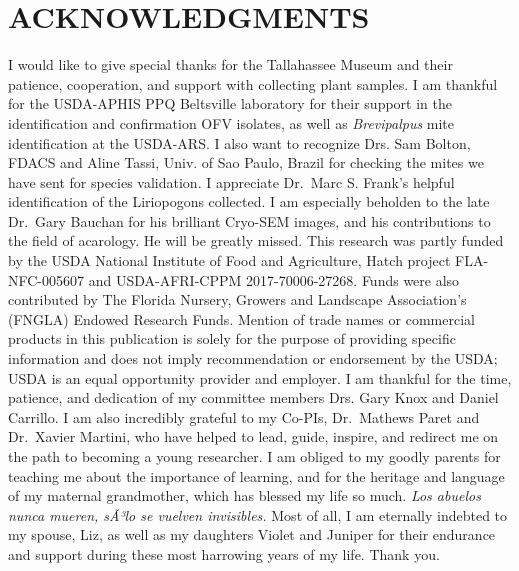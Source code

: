 \documentclass{ufdissertation}[overrideChapters] %
\begin{document}

{\hypertarget{acknowledgments}{%
\chapter{ACKNOWLEDGMENTS}\label{acknowledgments}}

I would like to give special thanks for the Tallahassee Museum and their patience, cooperation, and support with collecting plant samples. I am thankful for the USDA-APHIS PPQ Beltsville laboratory for their support in the identification and confirmation OFV isolates, as well as \emph{Brevipalpus} mite identification at the USDA-ARS. I also want to recognize Drs. Sam Bolton, FDACS and Aline Tassi, Univ. of Sao Paulo, Brazil for checking the mites we have sent for species validation. I appreciate Dr.~Marc S. Frank's helpful identification of the Liriopogons collected. I am especially beholden to the late Dr.~Gary Bauchan for his brilliant Cryo-SEM images, and his contributions to the field of acarology. He will be greatly missed. This research was partly funded by the USDA National Institute of Food and Agriculture, Hatch project FLA-NFC-005607 and USDA-AFRI-CPPM 2017-70006-27268. Funds were also contributed by The Florida Nursery, Growers and Landscape Association's (FNGLA) Endowed Research Funds. Mention of trade names or commercial products in this publication is solely for the purpose of providing specific information and does not imply recommendation or endorsement by the USDA; USDA is an equal opportunity provider and employer. I am thankful for the time, patience, and dedication of my committee members Drs. Gary Knox and Daniel Carrillo. I am also incredibly grateful to my Co-PIs, Dr.~Mathews Paret and Dr.~Xavier Martini, who have helped to lead, guide, inspire, and redirect me on the path to becoming a young researcher. I am obliged to my goodly parents for teaching me about the importance of learning, and for the heritage and language of my maternal grandmother, which has blessed my life so much. \emph{Los abuelos nunca mueren, sÃ³lo se vuelven invisibles.} Most of all, I am eternally indebted to my spouse, Liz, as well as my daughters Violet and Juniper for their endurance and support during these most harrowing years of my life. Thank you.}              %


\end{document}
